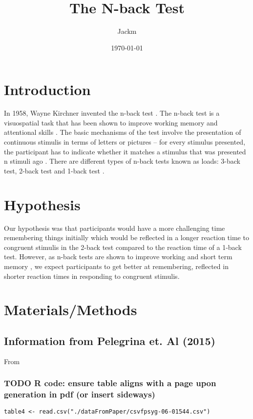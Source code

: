 \documentclass{article}
\author{Jackm}
\date{\today}
\title{The N-back Test}
\begin{document}
\maketitle
\tableofcontents


\section{Introduction}
\label{sec:orgb4e2f17}

In 1958, Wayne Kirchner invented the n-back test \cite{COULACOGLOU201791}. The n-back test is a visuospatial task that has been shown to improve working memory and attentional skills \cite{COLOM2013712}. The basic mechanisms of the test involve the presentation of continuous stimulis in terms of letters or pictures – for every stimulus presented, the participant has to indicate whether it matches a stimulus that was presented n stimuli ago \cite{Kane}. There are different types of n-back tests known as loads: 3-back test, 2-back test and 1-back test \cite{Forns}.

\section{Hypothesis}
\label{sec:orgef36647}

Our hypothesis was that participants would have a more challenging time remembering things initially which would be reflected in a longer reaction time to congruent stimulis in the 2-back test compared to the reaction time of a 1-back test. However, as n-back tests are shown to improve working and short term memory \cite{LEONDOMINGUEZ2015167}, we expect participants to get better at remembering, reflected in shorter reaction times in responding to congruent stimulis.

\section{Materials/Methods}
\label{sec:org42d605a}
\subsection{Information from Pelegrina et. Al (2015)}
\label{sec:org7c984c0}
From \cite{NormativeData}
\subsubsection{{\bfseries\sffamily TODO} R code: ensure table aligns with a page upon generation in pdf (or insert sideways)}
\label{sec:org245a0a8}
\begin{verbatim}
table4 <- read.csv("./dataFromPaper/csvfpsyg-06-01544.csv")


\end{verbatim}
\end{document}
